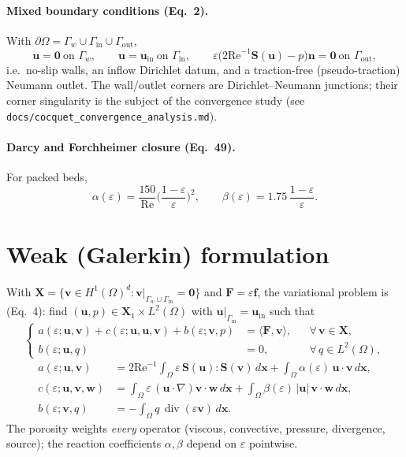 \documentclass[11pt]{article}
\newcommand{\uu}{\bm{u}}
\newcommand{\vv}{\bm{v}}
\newcommand{\ww}{\bm{w}}
\newcommand{\ff}{\bm{f}}
\newcommand{\nn}{\bm{n}}
\newcommand{\xx}{\bm{x}}
\newcommand{\grad}{\nabla}
\newcommand{\dive}{\operatorname{div}}
\newcommand{\Reyn}{\mathrm{Re}}
\newcommand{\Sten}{\bm{S}}
\newcommand{\dx}{\,d\xx}
\begin{document}
\paragraph{Mixed boundary conditions (Eq.~2).} With $\partial\Omega=\Gamma_w\cup\Gamma_{\mathrm{in}}\cup\Gamma_{\mathrm{out}}$,
\begin{equation}
\uu = \bm{0}\ \text{on }\Gamma_w,\qquad
\uu = \uu_{\mathrm{in}}\ \text{on }\Gamma_{\mathrm{in}},\qquad
\varepsilon\big(2\Reyn^{-1}\Sten(\uu)-p\big)\nn = \bm{0}\ \text{on }\Gamma_{\mathrm{out}},
\end{equation}
i.e.\ no-slip walls, an inflow Dirichlet datum, and a traction-free (pseudo-traction) Neumann outlet.
The wall/outlet corners are Dirichlet--Neumann junctions; their corner singularity is the subject of
the convergence study (see \texttt{docs/cocquet\_convergence\_analysis.md}).

\paragraph{Darcy and Forchheimer closure (Eq.~49).} For packed beds,
\begin{equation}
\alpha(\varepsilon)=\frac{150}{\Reyn}\Big(\frac{1-\varepsilon}{\varepsilon}\Big)^{2},
\qquad
\beta(\varepsilon)=1.75\,\frac{1-\varepsilon}{\varepsilon}.
\end{equation}

\section{Weak (Galerkin) formulation}

With $\bm{X}=\{\vv\in H^1(\Omega)^d:\vv|_{\Gamma_w\cup\Gamma_{\mathrm{in}}}=\bm 0\}$ and
$\bm{F}=\varepsilon\ff$, the variational problem is (Eq.~4): find
$(\uu,p)\in \bm{X}_1\times L^2(\Omega)$ with $\uu|_{\Gamma_{\mathrm{in}}}=\uu_{\mathrm{in}}$ such that
\begin{equation}
\left\{
\begin{aligned}
a(\varepsilon;\uu,\vv) + c(\varepsilon;\uu,\uu,\vv) + b(\varepsilon;\vv,p) &= \langle\bm F,\vv\rangle,
  && \forall\,\vv\in\bm X,\\
b(\varepsilon;\uu,q) &= 0, && \forall\,q\in L^2(\Omega),
\end{aligned}
\right.
\end{equation}
\begin{align}
a(\varepsilon;\uu,\vv) &= 2\Reyn^{-1}\!\int_\Omega \varepsilon\,\Sten(\uu){:}\Sten(\vv)\dx
   + \int_\Omega \alpha(\varepsilon)\,\uu\cdot\vv\dx,\\
c(\varepsilon;\uu,\vv,\ww) &= \int_\Omega \varepsilon\,(\uu\cdot\grad)\vv\cdot\ww\dx
   + \int_\Omega \beta(\varepsilon)\,|\uu|\,\vv\cdot\ww\dx,\\
b(\varepsilon;\vv,q) &= -\int_\Omega q\,\dive(\varepsilon\vv)\dx .
\end{align}
The porosity weights \emph{every} operator (viscous, convective, pressure, divergence, source); the
reaction coefficients $\alpha,\beta$ depend on $\varepsilon$ pointwise.
\end{document}
